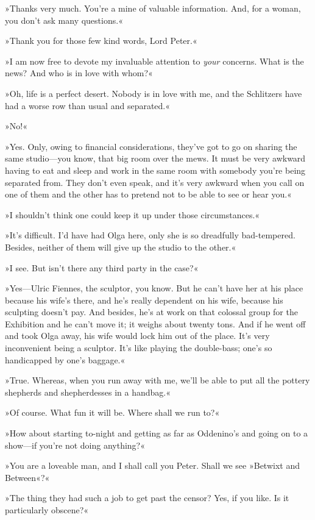 »Thanks very much. You're a mine of valuable information. And, for a woman, you don't ask many questions.«

»Thank you for those few kind words, Lord Peter.«

»I am now free to devote my invaluable attention to \textit{your} concerns. What is the news? And who is in love with whom?«

»Oh, life is a perfect desert. Nobody is in love with me, and the Schlitzers have had a worse row than usual and separated.«

»No!«

»Yes. Only, owing to financial considerations, they've got to go on sharing the same studio\allowbreak---\allowbreak you know, that big room over the mews. It must be very awkward having to eat and sleep and work in the same room with somebody you're being separated from. They don't even speak, and it's very awkward when you call on one of them and the other has to pretend not to be able to see or hear you.«

»I shouldn't think one could keep it up under those circumstances.«

»It's difficult. I'd have had Olga here, only she is so dreadfully bad-tempered. Besides, neither of them will give up the studio to the other.«

»I see. But isn't there any third party in the case?«

»Yes\allowbreak---\allowbreak Ulric Fiennes, the sculptor, you know. But he can't have her at his place because his wife's there, and he's really dependent on his wife, because his sculpting doesn't pay. And besides, he's at work on that colossal group for the Exhibition and he can't move it; it weighs about twenty tons. And if he went off and took Olga away, his wife would lock him out of the place. It's very inconvenient being a sculptor. It's like playing the double-bass; one's so handicapped by one's baggage.«

»True. Whereas, when you run away with me, we'll be able to put all the pottery shepherds and shepherdesses in a handbag.«

»Of course. What fun it will be. Where shall we run to?«

»How about starting to-night and getting as far as Oddenino's and going on to a show\allowbreak---\allowbreak if you're not doing anything?«

»You are a loveable man, and I shall call you Peter. Shall we see »Betwixt and Between«?«

»The thing they had such a job to get past the censor? Yes, if you like. Is it particularly obscene?«

